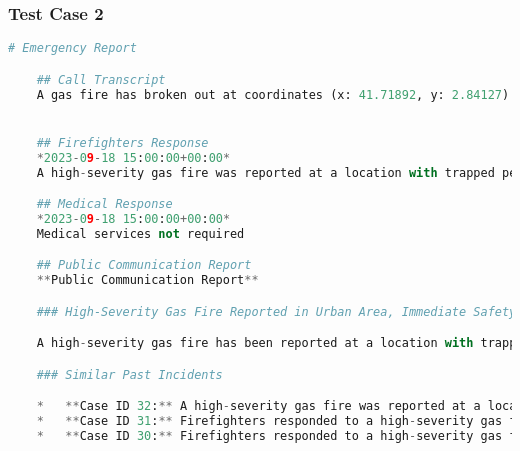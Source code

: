 \subsubsection{Test Case 2}

\begin{lstlisting}[language=Python]
    # Emergency Report

    ## Call Transcript
    A gas fire has broken out at coordinates (x: 41.71892, y: 2.84127). The fire is classified as high severity at an abandoned warehouse facility. The hazard present is a storage area containing multiple industrial gas cylinders, which poses a significant risk of explosion. The fire is indoors, but the building has been confirmed empty and unused for several months. No individuals are trapped or at risk, and a security check of the premises has confirmed no squatters or unauthorized persons are present. The fire poses a risk of spreading to neighboring structures if not contained quickly.


    ## Firefighters Response
    *2023-09-18 15:00:00+00:00*
    A high-severity gas fire was reported at a location with trapped people. We deployed 12 firefighting combatants to the scene and initiated suppression and ventilation activities. The estimated arrival time was 2023-09-18T14:30:00Z.

    ## Medical Response
    *2023-09-18 15:00:00+00:00*
    Medical services not required

    ## Public Communication Report
    **Public Communication Report**

    ### High-Severity Gas Fire Reported in Urban Area, Immediate Safety Information Provided

    A high-severity gas fire has been reported at a location with trapped people. The fire department has responded with 12 firefighting combatants and initiated suppression and ventilation activities. There are no injuries or medical services required. Citizens are advised to avoid the area until further notice.

    ### Similar Past Incidents

    *   **Case ID 32:** A high-severity gas fire was reported at a location with trapped people on September 25, 2023, at 14:30:00Z. Eight combatants were deployed to extinguish the fire using foam and secure nearby gas cylinders.
    *   **Case ID 31:** Firefighters responded to a high-severity gas fire at 41.71892, 2.84127 on September 25, 2023, at 14:30:00Z. Eight combatants were deployed to extinguish the fire with foam and secure nearby gas cylinders within estimated arrival time.
    *   **Case ID 30:** Firefighters responded to a high-severity gas fire at 41.71892, 2.84127 on September 25, 2023.


\end{lstlisting}
